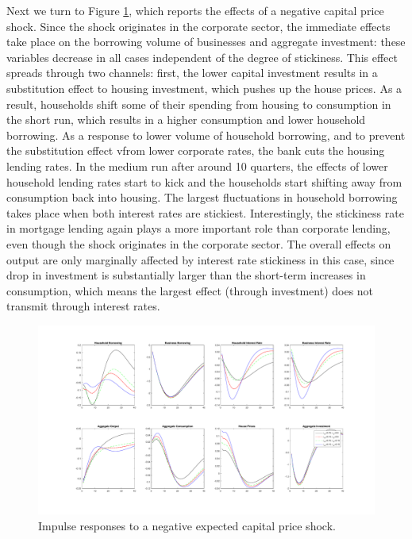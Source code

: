 \documentclass[12pt]{article}
\numberwithin{equation}{section}
\begin{document}
Next we turn to Figure \ref{irf_stickiness_EbF}, which reports the effects of a negative capital price shock. Since the shock originates in the corporate sector, the immediate effects take place on the borrowing volume of businesses and aggregate investment: these variables decrease in all cases independent of the degree of stickiness. This effect spreads through two channels: first, the lower capital investment results in a substitution effect to housing investment, which pushes up the house prices. As a result, households shift some of their spending from housing to consumption in the short run, which results in a higher consumption and lower household borrowing. As a response to lower volume of household borrowing, and to prevent the substitution effect vfrom lower corporate rates, the bank cuts the housing lending rates. In the medium run after around 10 quarters, the effects of lower household lending rates start to kick and the households start shifting away from consumption back into housing. The largest fluctuations in household borrowing takes place when both interest rates are stickiest. Interestingly, the stickiness rate in mortgage lending again plays a more important role than corporate lending, even though the shock originates in the corporate sector. The overall effects on output are only marginally affected by interest rate stickiness in this case, since drop in investment is substantially larger than the short-term increases in consumption, which means the largest effect (through investment) does not transmit through interest rates. 



\begin{figure}[H]
\centering
\caption{Impulse responses to a negative expected capital price shock.}
\label{irf_stickiness_EbF}
\includegraphics[scale=0.4]{stickinessNegativeShocksEbF.pdf}
\end{figure}
\end{document}
